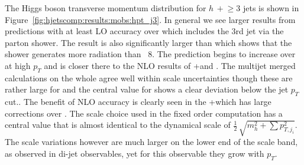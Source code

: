 The Higgs boson transverse momentum distribution for $h\,+\!\ge\!\!3$ jets is shown in
Figure~\ref{fig:hjetscomp:results:mobs:hpt_j3}. In general we see larger
results from predictions with at least LO accuracy over \Powheg which includes
the 3rd jet via the parton shower. The \Sherpa \NNLOPS result is also
significantly larger than \Powheg which shows that the \Sherpa shower generates
more radiation than \Pythia~8. The \Hej prediction begins to increase over
\Powheg at high $p_T$ and is closer there to the NLO results of \GoSam{}+\Sherpa and
\Sherpa \MEPSatNLO. The multijet merged calculations on the whole agree well
within scale uncertainties though these are rather large for \MGaMC and the
central value for \Herwig shows a clear deviation below the jet $p_T$ cut.. The
benefit of NLO accuracy is clearly seen in the \GoSam{}+\Sherpa which has large
corrections over \Powheg. The \Minlo scale choice used in the fixed order
computation has a central value that is almost identical to the dynamical scale
of $\tfrac{1}{2}\,\sqrt{m_{h}^2+\sum p_{T,j_i}^2}$. The scale variations
however are much larger on the lower end of the scale band, as observed in
di-jet observables, yet for this observable they grow with $p_T$.

